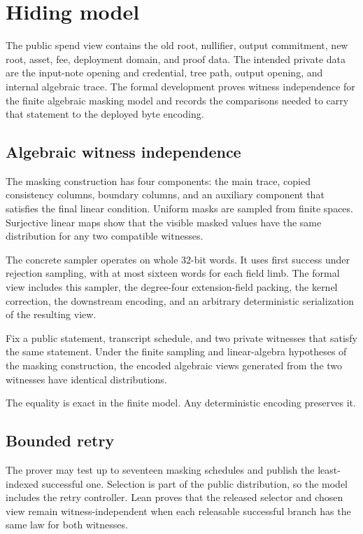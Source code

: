 \section{Hiding model}
\label{sec:privacy}

The public spend view contains the old root, nullifier, output commitment, new
root, asset, fee, deployment domain, and proof data.  The intended private data
are the input-note opening and credential, tree path, output opening, and
internal algebraic trace.  The formal development proves witness independence
for the finite algebraic masking model and records the comparisons needed to
carry that statement to the deployed byte encoding.

\subsection{Algebraic witness independence}

The masking construction has four components: the main trace, copied
consistency columns, boundary columns, and an auxiliary component that
satisfies the final linear condition.  Uniform masks are sampled from finite
spaces.  Surjective linear maps show that the visible masked values have the
same distribution for any two compatible witnesses.

The concrete sampler operates on whole 32-bit words.  It uses first success
under rejection sampling, with at most sixteen words for each field limb.  The
formal view includes this sampler, the degree-four extension-field packing,
the kernel correction, the downstream encoding, and an arbitrary deterministic
serialization of the resulting view.

\begin{theorem}
\label{thm:modeled-hiding}
Fix a public statement, transcript schedule, and two private witnesses that
satisfy the same statement.  Under the finite sampling and linear-algebra
hypotheses of the masking construction, the encoded algebraic views generated
from the two witnesses have identical distributions.
\end{theorem}

The equality is exact in the finite model.  Any deterministic encoding
preserves it.

\subsection{Bounded retry}

The prover may test up to seventeen masking schedules and publish the
least-indexed successful one.  Selection is part of the public distribution,
so the model includes the retry controller.  Lean proves that the released
selector and chosen view remain witness-independent when each releasable
successful branch has the same law for both witnesses.


